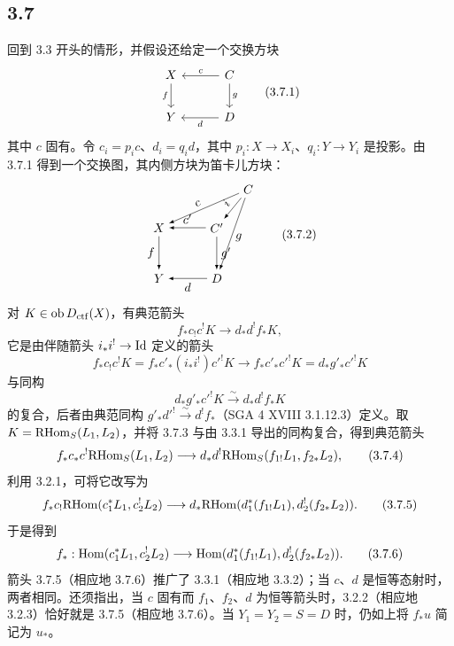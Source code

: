 \subsection*{3.7}
回到 3.3 开头的情形，并假设还给定一个交换方块
\begin{equation}
\begin{tikzcd}[column sep=3em,row sep=2em]
X \arrow[d,"f"'] & C \arrow[l,"c"'] \arrow[d,"g"] \\
Y & D \arrow[l,"d"]
\end{tikzcd}
\tag{3.7.1}
\end{equation}
其中 $c$ 固有。令 $c_i=p_ic$、$d_i=q_id$，其中 $p_i:X\to X_i$、$q_i:Y\to Y_i$ 是投影。由 3.7.1 得到一个交换图，其内侧方块为笛卡儿方块：
\begin{equation}
\begin{tikzpicture}[>=latex,baseline=(current bounding box.center),scale=1]
\node (X) at (0,0) {$X$};
\node (Y) at (0,-1.45) {$Y$};
\node (Cp) at (1.65,0) {$C'$};
\node (D) at (1.65,-1.45) {$D$};
\node (C) at (2.55,1.1) {$C$};
\draw[->] (C) -- node[above,sloped,pos=.55] {$c$} (X);
\draw[->] (C) -- node[above,sloped,pos=.50] {$i$} (Cp);
\draw[->] (C) -- node[right,pos=.55] {$g$} (D);
\draw[->] (Cp) -- node[above] {$c'$} (X);
\draw[->] (Cp) -- node[right] {$g'$} (D);
\draw[->] (X) -- node[left] {$f$} (Y);
\draw[->] (D) -- node[below] {$d$} (Y);
\end{tikzpicture}
\tag{3.7.2}
\end{equation}
对 $K\in\operatorname{ob}D_{\mathrm{ctf}}(X)$，有典范箭头
\begin{equation}
f_*c_!c^!K\longrightarrow d_*d^!f_*K,
\tag{3.7.3}
\end{equation}
它是由伴随箭头 $i_*i^!\to\mathrm{Id}$ 定义的箭头
\[
f_*c_!c^!K=f_*c'_*(i_*i^!)c'^!K\longrightarrow f_*c'_*c'^!K=d_*g'_*c'^!K
\]
与同构
\[
d_*g'_*c'^!K\xrightarrow{\sim}d_*d^!f_*K
\]
的复合，后者由典范同构 $g'_*d'^!\xrightarrow{\sim}d^!f_*$（SGA 4 XVIII 3.1.12.3）定义。取 $K=\mathrm{RHom}_S(L_1,L_2)$，并将 3.7.3 与由 3.3.1 导出的同构复合，得到典范箭头
\begin{equation}
f_*c_*c^!\mathrm{RHom}_S(L_1,L_2)
\longrightarrow
 d_*d^!\mathrm{RHom}_S(f_{1!}L_1,f_{2*}L_2),
\tag{3.7.4}
\end{equation}
利用 3.2.1，可将它改写为
\begin{equation}
f_*c_!\mathrm{RHom}(c_1^*L_1,c_2^!L_2)
\longrightarrow
 d_*\mathrm{RHom}(d_1^*(f_{1!}L_1),d_2^!(f_{2*}L_2)).
\tag{3.7.5}
\end{equation}
于是得到
\begin{equation}
f_*:\operatorname{Hom}(c_1^*L_1,c_2^!L_2)
\longrightarrow
\operatorname{Hom}(d_1^*(f_{1!}L_1),d_2^!(f_{2*}L_2)).
\tag{3.7.6}
\end{equation}
箭头 3.7.5（相应地 3.7.6）推广了 3.3.1（相应地 3.3.2）；当 $c$、$d$ 是恒等态射时，两者相同。还须指出，当 $c$ 固有而 $f_1$、$f_2$、$d$ 为恒等箭头时，3.2.2（相应地 3.2.3）恰好就是 3.7.5（相应地 3.7.6）。当 $Y_1=Y_2=S=D$ 时，仍如上将 $f_*u$ 简记为 $u_*$。

